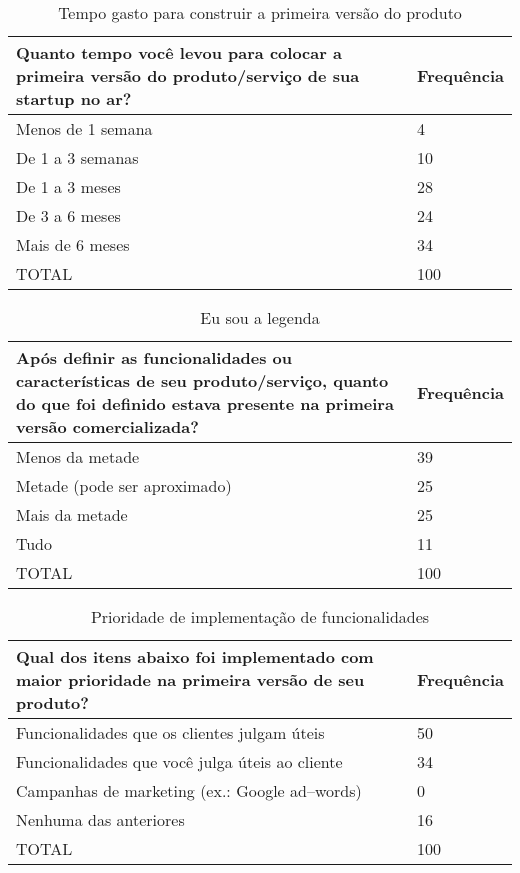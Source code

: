 \begin{table*}[hb]
\centering
\caption{Tempo gasto para construir a primeira vers\~ao do produto}
\label{tab:pergunta6}
\begin{tabular}{|p{10cm}|p{2cm}|}
\hline{\bf Quanto tempo voc\^e levou para colocar a primeira vers\~ao do produto/servi\c{c}o de sua startup no ar?} & {\bf Frequ\^encia}\\
\hline Menos de 1 semana & 4\\
\hline De 1 a 3 semanas & 10\\
\hline De 1 a 3 meses & 28\\
\hline De 3 a 6 meses & 24\\
\hline Mais de 6 meses & 34\\
\hline TOTAL & 100\\
\hline
\end{tabular}
\end{table*}

\begin{table*}[hb]
\centering
\caption{Eu sou a legenda}
\label{tab:pergunta7}
\begin{tabular}{|p{10cm}|p{2cm}|}
\hline{\bf Ap\'os definir as funcionalidades ou caracter\'isticas de seu produto/servi\c{c}o, quanto do que foi definido estava presente na primeira vers\~ao comercializada?} & {\bf Frequ\^encia}\\
\hline Menos da metade & 39\\
\hline Metade (pode ser aproximado) & 25\\
\hline Mais da metade & 25\\
\hline Tudo & 11\\
\hline TOTAL & 100\\
\hline
\end{tabular}
\end{table*}

\begin{table*}[hb]
\centering
\caption{Prioridade de implementa\c{c}\~ao de funcionalidades}
\label{tab:pergunta8}
\begin{tabular}{|p{10cm}|p{2cm}|}
\hline{\bf Qual dos itens abaixo foi implementado com maior prioridade na primeira vers\~ao de seu produto?} & {\bf Frequ\^encia}\\
\hline Funcionalidades que os clientes julgam \'uteis & 50\\
\hline Funcionalidades que voc\^e julga \'uteis ao cliente & 34\\
\hline Campanhas de marketing (ex.: Google ad--words) & 0\\
\hline Nenhuma das anteriores & 16\\
\hline TOTAL & 100\\
\hline
\end{tabular}
\end{table*}

